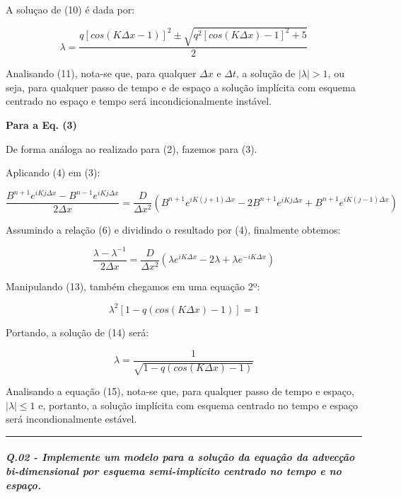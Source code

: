 \documentclass[11pt]{article}
\begin{document}
A soluçao de (10) é dada por:

\begin{equation}
    \lambda = \frac{q[cos(K\Delta{x} -1)]^2 \pm \sqrt{q^2[cos(K\Delta{x})-1]^2 + 5} }{2}
\end{equation}

Analisando (11), nota-se que, para qualquer \(\Delta{x}\) e
\(\Delta{t}\), a solução de \(|\lambda| > 1\), ou seja, para qualquer
passo de tempo e de espaço a solução implícita com esquema centrado no
espaço e tempo será incondicionalmente instável.

\textbf{Para a Eq. (3)}

De forma análoga ao realizado para (2), fazemos para (3).

Aplicando (4) em (3):

\begin{equation}
        \frac{B^{n+1}e^{iKj\Delta{x}} - B^{n-1}e^{iKj\Delta{x}} }{2\Delta{x}} = \frac{D}{\Delta{x^2}}(B^{n+1}e^{iK(j+1)\Delta{x}} - 2B^{n+1}e^{iKj\Delta{x}} + B^{n+1}e^{iK(j-1)\Delta{x}})
\end{equation}

Assumindo a relação (6) e dividindo o resultado por (4), finalmente
obtemos:

\begin{equation}
    \frac{\lambda - \lambda^{-1}}{2\Delta{x}} = \frac{D}{\Delta{x^2}}(\lambda e^{iK\Delta{x}} - 2\lambda + \lambda e^{-iK\Delta{x}})
\end{equation}

Manipulando (13), também chegamos em uma equação 2º:

\begin{equation}
    \lambda^{2}[1 - q(cos(K\Delta{x}) - 1)] = 1
\end{equation}

Portando, a solução de (14) será:

\begin{equation}
    \lambda = \frac{1}{\sqrt{1 - q(cos(K\Delta{x}) - 1)}}
\end{equation}

Analisando a equação (15), nota-se que, para qualquer passo de tempo e
espaço, \(|\lambda| \le 1\) e, portanto, a solução implícita com esquema
centrado no tempo e espaço será incondionalmente estável.

    \begin{center}\rule{0.5\linewidth}{\linethickness}\end{center}

    \subparagraph{Q.02 - Implemente um modelo para a solução da equação da
advecção bi-dimensional por esquema semi-implícito centrado no tempo e
no
espaço.}\label{q.02---implemente-um-modelo-para-a-soluuxe7uxe3o-da-equauxe7uxe3o-da-advecuxe7uxe3o-bi-dimensional-por-esquema-semi-impluxedcito-centrado-no-tempo-e-no-espauxe7o.}
\end{document}
